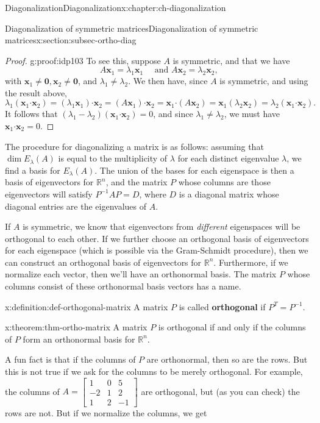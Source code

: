 \documentclass[oneside,10pt,]{book}
\newcommand{\terminology}[1]{\textbf{#1}}
\numberwithin{equation}{section}
\newcommand{\bbm}{\begin{bmatrix}}
\newcommand{\ebm}{\end{bmatrix}}
\newcommand{\R}{\mathbb{R}}
\newcommand{\dotp}{\!\boldsymbol{\cdot}\!}
\newcommand{\xx}{\mathbf{x}}
\newcommand{\amp}{&}
\begin{document}
\begin{chapterptx}{Diagonalization}{}{Diagonalization}{}{}{x:chapter:ch-diagonalization}
\begin{sectionptx}{Diagonalization of symmetric matrices}{}{Diagonalization of symmetric matrices}{}{}{x:section:subsec-ortho-diag}
\begin{proof}{}{g:proof:idp103}
To see this, suppose \(A\) is symmetric, and that we have%
\begin{equation*}
A\xx_1=\lambda_1\xx_1\quad \text{ and } A\xx_2=\lambda_2\xx_2\text{,}
\end{equation*}
with \(\xx_1\neq\mathbf{0},\xx_2\neq \mathbf{0}\), and \(\lambda_1\neq \lambda_2\). We then have, since \(A\) is symmetric, and using the result above,%
\begin{equation*}
\lambda_1(\xx_1\dotp \xx_2) = (\lambda_1\xx_1)\dotp \xx_2 = (A\xx_1)\dotp \xx_2 = \xx_1\dotp(A\xx_2) = \xx_1(\lambda_2\xx_2) = \lambda_2(\xx_1\dotp\xx_2)\text{.}
\end{equation*}
It follows that \((\lambda_1-\lambda_2)(\xx_1\dotp \xx_2)=0\), and since \(\lambda_1\neq \lambda_2\), we must have \(\xx_1\dotp \xx_2=0\).%
\end{proof}
The procedure for diagonalizing a matrix is as follows: assuming that \(\dim E_\lambda(A)\) is equal to the multiplicity of \(\lambda\) for each distinct eigenvalue \(\lambda\), we find a basis for \(E_\lambda(A)\). The union of the bases for each eigenspace is then a basis of eigenvectors for \(\R^n\), and the matrix \(P\) whose columns are those eigenvectors will satisfy \(P^{-1}AP = D\), where \(D\) is a diagonal matrix whose diagonal entries are the eigenvalues of \(A\).%
\par
If \(A\) is symmetric, we know that eigenvectors from \emph{different} eigenspaces will be orthogonal to each other. If we further choose an orthogonal basis of eigenvectors for each eigenspace (which is possible via the Gram-Schmidt procedure), then we can construct an orthogonal basis of eigenvectors for \(\R^n\). Furthermore, if we normalize each vector, then we'll have an orthonormal basis. The matrix \(P\) whose columns consist of these orthonormal basis vectors has a name.%
\begin{definition}{}{x:definition:def-orthogonal-matrix}%
A matrix \(P\) is called \terminology{orthogonal} if \(P^T = P^{-1}\).%
\end{definition}
\begin{theorem}{}{}{x:theorem:thm-ortho-matrix}%
A matrix \(P\) is orthogonal if and only if the columns of \(P\) form an orthonormal basis for \(\R^n\).%
\end{theorem}
A fun fact is that if the columns of \(P\) are orthonormal, then so are the rows. But this is not true if we ask for the columns to be merely orthogonal. For example, the columns of \(A = \bbm 1\amp 0\amp 5\\-2\amp 1\amp 2\\1\amp 2\amp -1\ebm \) are orthogonal, but (as you can check) the rows are not. But if we normalize the columns, we get%

\end{sectionptx}
\end{chapterptx}
\end{document}
